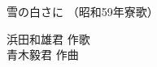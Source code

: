 \documentclass[10pt,b5j]{tarticle} %
\begin{document}
\begin{minipage}[c]{0.7\hsize} %
    \begin{center}
        {\LARGE
            雪の白さに %
        }
        {\small 
            （昭和59年寮歌） %
        }
    \end{center}
\end{minipage}
\begin{minipage}[c]{0.3\hsize} %
    \begin{flushright} %
        浜田和雄君 作歌\\青木毅君 作曲 %
    \end{flushright}
\end{minipage}
\end{document}
